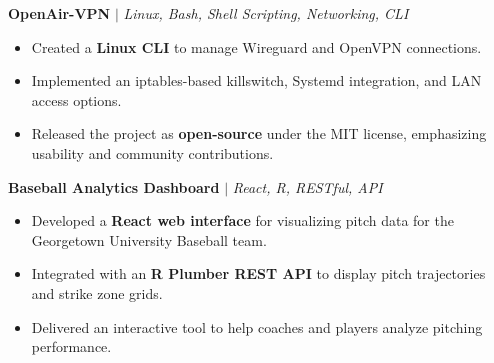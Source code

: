 \documentclass[11pt,letterpaper]{article}
\begin{document}
\begin{list}{}{\setlength{\leftmargin}{1em}\setlength{\rightmargin}{2pt}}
    \item
        \small{\textbf{OpenAir-VPN}} $|$ \small{\textit{Linux, Bash, Shell Scripting, Networking, CLI}} \hfill \small{\textit{}}
          \begin{itemize}[itemsep=-5pt, topsep=-2pt]
              \item Created a \textbf{Linux CLI} to manage Wireguard and OpenVPN connections.
              \item Implemented an iptables-based killswitch, Systemd integration, and LAN access options.
              \item Released the project as \textbf{open-source} under the MIT license, emphasizing usability and community contributions.
          \end{itemize}
          \vspace{4pt}
    
    \item
          \textbf{Baseball Analytics Dashboard} $|$ \small{\textit{React, R, RESTful, API}} \hfill \small{\textit{}}
          \begin{itemize}[itemsep=-5pt, topsep=-2pt]
              \item Developed a \textbf{React web interface} for visualizing pitch data for the Georgetown University Baseball team.
              \item Integrated with an \textbf{R Plumber REST API} to display pitch trajectories and strike zone grids.
              \item Delivered an interactive tool to help coaches and players analyze pitching performance.
          \end{itemize}
\end{list}


\end{document}
